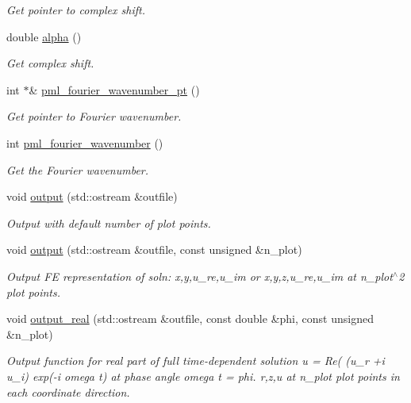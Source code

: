 \begin{DoxyCompactItemize}
\begin{DoxyCompactList}\small\item\em Get pointer to complex shift. \end{DoxyCompactList}\item 
double \hyperlink{classoomph_1_1PMLFourierDecomposedHelmholtzEquationsBase_a542387db09b5edf390be1f5c9a28b4d5}{alpha} ()
\begin{DoxyCompactList}\small\item\em Get complex shift. \end{DoxyCompactList}\item 
int $\ast$\& \hyperlink{classoomph_1_1PMLFourierDecomposedHelmholtzEquationsBase_a97c7756b145a860ce91dfb48349f0fcf}{pml\+\_\+fourier\+\_\+wavenumber\+\_\+pt} ()
\begin{DoxyCompactList}\small\item\em Get pointer to Fourier wavenumber. \end{DoxyCompactList}\item 
int \hyperlink{classoomph_1_1PMLFourierDecomposedHelmholtzEquationsBase_af904c79fdca12041b5778e21eac9f926}{pml\+\_\+fourier\+\_\+wavenumber} ()
\begin{DoxyCompactList}\small\item\em Get the Fourier wavenumber. \end{DoxyCompactList}\item 
void \hyperlink{classoomph_1_1PMLFourierDecomposedHelmholtzEquationsBase_afd7ba1d501ff89f1be4579c2b0c3d272}{output} (std\+::ostream \&outfile)
\begin{DoxyCompactList}\small\item\em Output with default number of plot points. \end{DoxyCompactList}\item 
void \hyperlink{classoomph_1_1PMLFourierDecomposedHelmholtzEquationsBase_afb6aca29a5d78e2984c8602d05459cac}{output} (std\+::ostream \&outfile, const unsigned \&n\+\_\+plot)
\begin{DoxyCompactList}\small\item\em Output FE representation of soln\+: x,y,u\+\_\+re,u\+\_\+im or x,y,z,u\+\_\+re,u\+\_\+im at n\+\_\+plot$^\wedge$2 plot points. \end{DoxyCompactList}\item 
void \hyperlink{classoomph_1_1PMLFourierDecomposedHelmholtzEquationsBase_a5f933a0dcde510e734d387fea9b65cc2}{output\+\_\+real} (std\+::ostream \&outfile, const double \&phi, const unsigned \&n\+\_\+plot)
\begin{DoxyCompactList}\small\item\em Output function for real part of full time-\/dependent solution u = Re( (u\+\_\+r +i u\+\_\+i) exp(-\/i omega t) at phase angle omega t = phi. r,z,u at n\+\_\+plot plot points in each coordinate direction. \end{DoxyCompactList}\item 

\end{DoxyCompactItemize}
